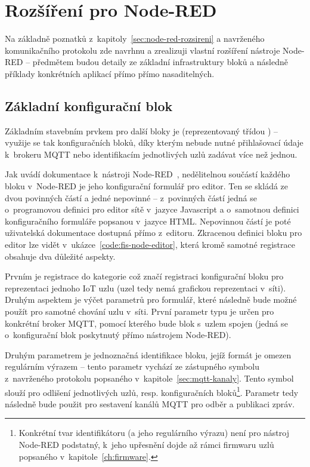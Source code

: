 \chapter{Rozšíření pro Node-RED}
\label{ch:rozsireni}

Na základně poznatků z~kapitoly~\ref{sec:node-red-rozsireni} a navrženého komunikačního protokolu zde navrhnu a
zrealizuji vlastní rozšíření nástroje Node-RED -- předmětem budou detaily ze základní infrastruktury bloků a následně
příklady konkrétních aplikací přímo přímo nasaditelných.

\section{Základní konfigurační blok}\label{sec:zakladni-konfiguracni-blok}
Základním stavebním prvkem pro další bloky je  (reprezentovaný třídou \mbox{)} -- využije se
tak
konfiguračních bloků, díky kterým nebude nutné přihlašovací údaje k~brokeru MQTT nebo identifikacím jednotlivých
uzlů zadávat více než jednou.

Jak uvádí dokumentace k~nástroji Node-RED~\cite{NodeRedDocs}, nedělitelnou součástí každého bloku v~Node-RED je jeho
konfigurační formulář pro editor.
Ten se skládá ze dvou povinných částí a jedné nepovinné -- z~povinných částí jedná se o~programovou definici pro editor
sítě v~jazyce Javascript a o~samotnou definici konfiguračního formuláře popsanou v~jazyce HTML.
Nepovinnou částí je poté uživatelská dokumentace dostupná přímo z~editoru.
Zkracenou definici bloku pro editor lze vidět v~ukázce~\ref{code:fis-node-editor}, která kromě samotné registrace
obsahuje dva důležité aspekty.

Prvním je registrace do kategorie  což značí registraci konfigurační bloku pro reprezentaci jednoho IoT
uzlu (uzel tedy nemá grafickou reprezentaci v~síti).
Druhým aspektem je výčet parametrů pro formulář, které následně bude možné použít pro samotné chování uzlu v~síti.
První parametr typu  je určen pro konkrétní broker MQTT, pomocí kterého bude blok s~uzlem spojen
(jedná se o~konfigurační blok poskytnutý přímo nástrojem Node-RED).

Druhým parametrem je jednoznačná identifikace bloku, jejíž formát je omezen regulárním výrazem -- tento
parametr vychází ze zástupného symbolu  z~navrženého protokolu popsaného
v~kapitole~\ref{sec:mqtt-kanaly}.
Tento symbol slouží pro odlišení jednotlivých uzlů, resp. konfiguračních bloků\footnote{Konkrétní tvar
identifikátoru (a jeho regulárního výrazu) není pro nástroj Node-RED podstatný, k~jeho upřesnění dojde až rámci
firmwaru uzlů popsaného v~kapitole~\ref{ch:firmware}.}.
Parametr  tedy následně bude použit pro sestavení kanálů MQTT pro odběr a publikaci zpráv.

